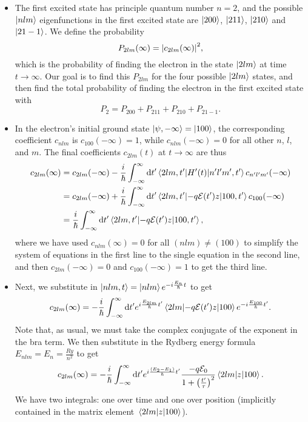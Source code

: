\documentclass[11pt, a4paper]{article}
\newcommand{\diff}{\mathop{}\!\mathrm{d}} %
\newcommand{\p}{\psi}  %
\newcommand{\E}{\mathcal{E}}  %
\begin{document}
	
\begin{itemize}
	\item The first excited state has principle quantum number $ n = 2 $, and the possible $ \ket{nlm} $ eigenfunctions in the first excited state are $ \ket{200} $, $ \ket{211} $, $ \ket{210} $ and $ \ket{21-1} $. We define the probability
	\begin{equation*}
		P_{2lm}(\infty) = \abs{c_{2lm}(\infty)}^{2},
	\end{equation*} 
	which is the probability of finding the electron in the state $ \ket{2lm} $ at time $ t \to \infty $. Our goal is to find this $ P_{2lm} $ for the four possible $ \ket{2lm} $ states, and then find the total probability of finding the electron in the first excited state with
	\begin{equation*}
		P_{2} = P_{200} + P_{211} + P_{210} + P_{21-1}.
	\end{equation*}
	
	\item In the electron's initial ground state $ \ket{\p, -\infty} = \ket{100} $, the corresponding coefficient $ c_{nlm} $ is $ c_{100}(-\infty) = 1 $, while $ c_{nlm}(-\infty) = 0 $ for all other $ n $, $ l $, and $ m $. The final coefficients $ c_{2lm}(t) $ at $ t \to \infty $ are thus
	\begin{align*}
		c_{2lm}(\infty) &= c_{2lm}(-\infty) - \frac{i}{\hbar} \int_{-\infty}^{\infty} \diff t' \mel{2lm, t'}{H'(t)}{n'l'm', t'}c_{n'l'm'}(-\infty)\\
		& = c_{2lm}(-\infty)  + \frac{i}{\hbar} \int_{-\infty}^{\infty} \diff t' \mel{2lm, t'}{-q\E(t')z}{100, t'}c_{100}(-\infty)\\
		& = \frac{i}{\hbar} \int_{-\infty}^{\infty} \diff t' \mel{2lm, t'}{-q\E(t')z}{100, t'},
	\end{align*}
	where we have used $ c_{nlm}(\infty) = 0 $ for all $ (nlm) \neq (100) $ to simplify the system of equations in the first line to the single equation in the second line, and then $ c_{2lm}(-\infty) = 0 $ and $ c_{100}(-\infty) = 1 $ to get the third line.
	
	\item Next, we substitute in $ \ket{nlm, t} = \ket{nlm}e^{-i\frac{E_{n}}{\hbar}t} $ to get 
	\begin{equation*}
		c_{2lm}(\infty) = - \frac{i}{\hbar} \int_{-\infty}^{\infty} \diff t'  e^{i\frac{E_{2lm}}{\hbar}t'} \mel{2lm}{-q\E(t')z}{100}e^{-i\frac{E_{100}}{\hbar}t'}.
	\end{equation*}
	Note that, as usual, we must take the complex conjugate of the exponent in the bra term. We then substitute in the Rydberg energy formula $ E_{nlm} = E_{n} = \frac{\si{Ry}}{n^{2}} $ to get
	\begin{equation*}
		c_{2lm}(\infty) = - \frac{i}{\hbar} \int_{-\infty}^{\infty} \diff t'  e^{i\frac{(E_{2} - E_{1})}{\hbar}t'} \frac{-q \E_{0}}{1 + \left(\frac{t'}{\tau}\right)^{2}}\mel{2lm}{z}{100}.
	\end{equation*}
	We have two integrals: one over time and one over position (implicitly contained in the matrix element $ \mel{2lm}{z}{100} $).
	

\end{itemize}
\end{document}
